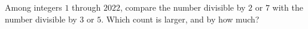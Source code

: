 Among integers $1$ through $2022$, compare the number divisible by $2$ or $7$ with the number divisible by $3$ or $5$. Which count is larger, and by how much?
